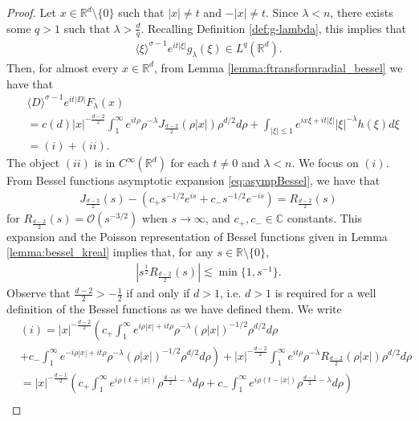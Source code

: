\documentclass[10pt,a4paper]{amsart}
\begin{document}
\begin{proof}
Let $x \in \mathbb{R}^d \setminus \{0\}$ such that $|x| \neq t$ and $-|x| \neq t$. Since $\lambda < n$, there exists some $q > 1$ such that $\lambda > \frac{d}{q}$. Recalling Definition \ref{def:g-lambda}, this implies that 
\begin{align*}
\langle \xi \rangle^{\sigma-1} e^{it|\xi|} g_{\lambda}(\xi) \in L^q(\mathbb{R}^d).
\end{align*}
Then, for almost every $x \in \mathbb{R}^d$, from Lemma \ref{lemma:ftransformradial_bessel} we have that
\begin{align*}
&\langle D \rangle^{\sigma-1} e^{it|D|} F_{\lambda}(x) \nonumber \\
&=c(d) |x|^{-\frac{d-2}{2}} \int_1^{\infty}  e^{it\rho}  \rho^{-\lambda} J_{\frac{d-2}{2}}(\rho|x|) \rho^{d/2} d\rho + \int_{|\xi| \leq 1} e^{ix\xi + it|\xi|} |\xi|^{-\lambda} h(\xi) d\xi \nonumber \\
&=(i) + (ii).  
\end{align*}
The object $(ii)$ is in $C^{\infty}(\mathbb{R}^d)$ for each $t \neq 0$ and $\lambda < n$. We focus on $(i)$. From Bessel functions asymptotic expansion \eqref{eq:asympBessel}, we have that
\begin{align*}
J_{\frac{d-2}{2}}(s)  - \left( c_+ s^{-1/2} e^{is} + c_- s^{-1/2} e^{-is} \right) = R_{\frac{d-2}{2}}(s)
\end{align*}
for $R_{\frac{d-2}{2}}(s) = \mathcal{O}(s^{-3/2})$ when $s \rightarrow \infty$, and 
$c_+, c_- \in \mathbb{C}$ constants. This expansion and the Poisson representation of Bessel functions given in Lemma \ref{lemma:bessel_kreal} implies that, for any $s \in \mathbb{R} \setminus \{0\}$,
\begin{align}\label{eq:ourbessel-asymp}
|s^{\frac{1}{2}}R_{\frac{d-2}{2}}(s)| \lesssim \min\{ 1 , s^{-1} \}.
\end{align}
Observe that $\frac{d-2}{2} > -\frac{1}{2}$ if and only if $d > 1$, i.e. $d>1$ is required for a well definition of the Bessel functions as we have defined them. We write
\begin{align*}
&(i) = |x|^{-\frac{d-2}{2}} \left( c_+ \int_1^{\infty}  e^{i\rho|x| + it\rho} \rho^{-\lambda} (\rho|x|)^{-1/2} \rho^{d/2} d\rho \right.   \nonumber \\
&\left. + c_- \int_1^{\infty} e^{-i\rho|x| + it\rho} \rho^{-\lambda} (\rho|x|)^{-1/2} \rho^{d/2} d\rho \right) + |x|^{-\frac{d-2}{2}} \int_1^{\infty} e^{it\rho} \rho^{-\lambda} R_{\frac{d-2}{2}}(\rho|x|) \rho^{d/2} d\rho \nonumber \\
&= |x|^{-\frac{d-1}{2}} \left(c_+ \int_{1}^{\infty}  e^{i \rho ( t + |x|)}  \rho^{\frac{d-1}{2} - \lambda} d\rho + c_- \int_{1}^{\infty}  e^{i \rho( t - |x|)}  \rho^{\frac{d-1}{2} - \lambda} d\rho \right) \nonumber \\

\end{align*}
\end{proof}
\end{document}
